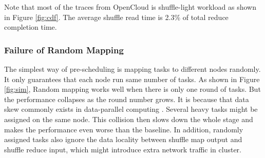 


Note that most of the traces from OpenCloud is shuffle-light workload as shown in Figure \ref{fig:cdf}. The average shuffle read time is 2.3\% of total reduce completion time.

\subsubsection{Failure of Random Mapping}\label{randomassign}
The simplest way of pre-scheduling is mapping tasks to different nodes randomly. It only guarantees that each node run same number of tasks. As shown in Figure \ref{fig:sim}, Random mapping works well when there is only one round of tasks. But the performance collapses as the round number grows. It is because that data skew commonly exists in data-parallel computing \cite{skewtune, reining, gufler2012load}. Several heavy tasks might be assigned on the same node. This collision then slows down the whole stage and makes the performance even worse than the baseline. In addition, randomly assigned tasks also ignore the data locality between shuffle map output and shuffle reduce input, which might introduce extra network traffic in cluster.


